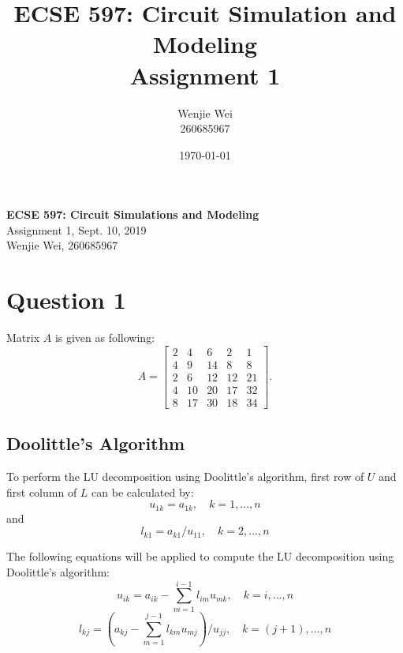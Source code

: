 \documentclass[a4paper,titlepage]{article}
\title{\textbf{ECSE 597: Circuit Simulation and Modeling} \\ Assignment 1}
\author{Wenjie Wei \\ 260685967}
\date{\today}
\begin{document}
	\sloppy	
	
	\begin{center}
		{\LARGE \bf ECSE 597: Circuit Simulations and Modeling}\\
		{\large Assignment 1, Sept. 10, 2019}\\
		{Wenjie Wei, 260685967}
	\end{center}
	
	\section{Question 1}
		Matrix $A$ is given as following:
		$$
			A = \begin{bmatrix}
				2 & 4 & 6 & 2 & 1\\
				4 & 9 & 14 & 8 & 8\\
				2 & 6 & 12 & 12 & 21\\
				4 & 10 & 20 & 17 & 32\\
				8 & 17 & 30 & 18 & 34
			\end{bmatrix}.
		$$
	
		\subsection{Doolittle's Algorithm}		
			To perform the LU decomposition using Doolittle's algorithm, first row of $U$ and first column of $L$ can be calculated by:
			\begin{equation}
				u_{1k} = a_{1k}, \quad k = 1, ..., n
				\label{1st_row}
			\end{equation}		
			and
			\begin{equation}
				l_{k1} = a_{k1} / u_{11}, \quad k = 2,...,n
				\label{1st_col}
			\end{equation}
			
			The following equations will be applied to compute the LU decomposition using Doolittle's algorithm:
			\begin{equation}
				u_{ik} = a_{ik} - \sum_{m=1}^{i-1} l_{im}u_{mk}, \quad k = i, ..., n
				\label{rows}
			\end{equation}
			\begin{equation}
				l_{kj} = (a_{kj} - \sum_{m=1}^{j-1} l_{km}u_{mj}) / u_{jj}, \quad k = (j+1), ..., n
				\label{cols}
			\end{equation}
			
\end{document}
